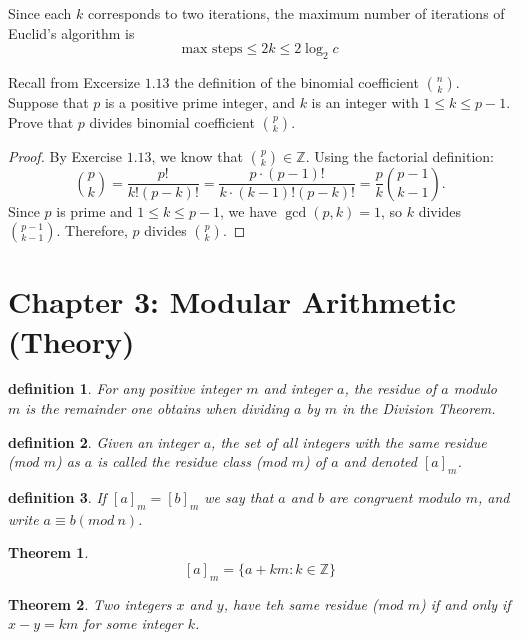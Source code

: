 \documentclass[8pt]{article}
\newtheorem{theorem}{Theorem}
\newtheorem{definition}{definition}
\begin{document}
Since each \(k\) corresponds to two iterations, the maximum number of iterations of Euclid's algorithm is
\[
\text{max steps} \le 2k \le 2 \log_2 c
\]

\begin{tcolorbox}[title=Problem 19, breakable]
    Recall from Excersize $1.13$ the definition of the binomial coefficient 
    $\binom{n}{k}$. Suppose that $p$ is a positive prime integer, and $k$ is 
    an integer with $1 \le k \le p - 1$. Prove that $p$ divides binomial    
    coefficient $\binom{p}{k}$.
\end{tcolorbox}

\begin{proof}
By Exercise $1.13$, we know that $\binom{p}{k} \in \mathbb{Z}$.  
Using the factorial definition:
\[
\binom{p}{k} = \frac{p!}{k!(p-k)!} = \frac{p \cdot (p-1)!}{k \cdot (k-1)! (p-k)!} = \frac{p}{k} \binom{p-1}{k-1}.
\]
Since $p$ is prime and $1 \le k \le p-1$, we have $\gcd(p,k)=1$, 
so $k$ divides $\binom{p-1}{k-1}$. Therefore, $p$ divides $\binom{p}{k}$.
\end{proof}

\section{Chapter 3: Modular Arithmetic (Theory)}

\begin{definition}
    For any positive integer $m$ and integer $a$, the residue of $a$ modulo $m$
    is the remainder one obtains when dividing $a$ by $m$ in the Division Theorem.
\end{definition}

\begin{definition}
    Given an integer $a$, the set of all integers with the same residue (mod $m$)
    as $a$ is called the residue class (mod $m$) of $a$ and denoted $[a]_m$.
\end{definition}

\begin{definition}
    If $[a]_m = [b]_m$ we say that $a$ and $b$ are congruent modulo $m$,
    and write $a \equiv b (mod\ n)$.
\end{definition}

\begin{theorem}
    \[[a]_m = \{a + km : k \in \mathbb{Z}\}\]
\end{theorem}

\begin{theorem}
    Two integers $x$ and $y$, have teh same residue (mod $m$)
    if and only if $x - y = km$ for some integer $k$.
\end{theorem}
\end{document}
